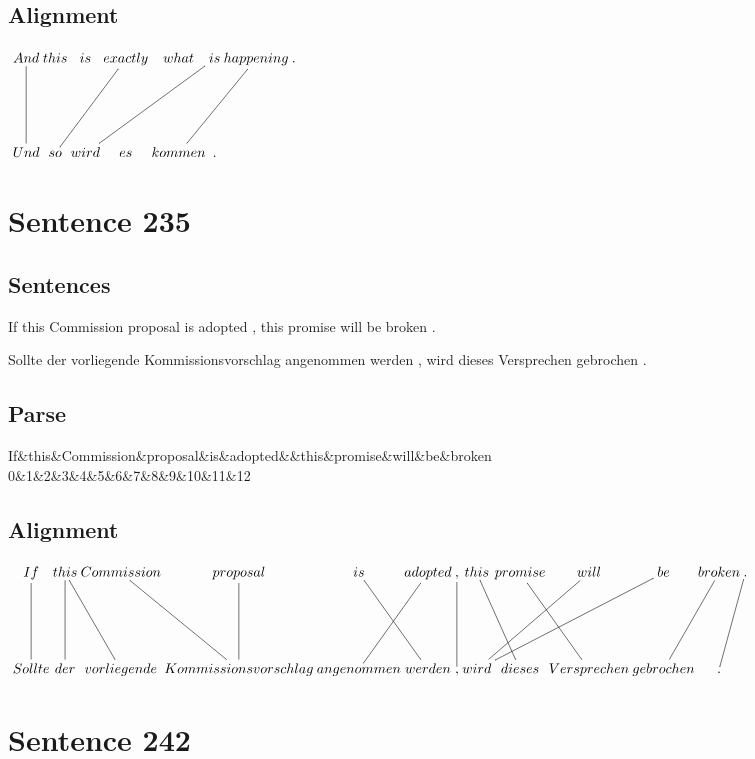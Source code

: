 \documentclass{report}
\begin{document}
\subsection*{Alignment}
\scriptsize{
$
\xymatrix@C-2.3pc{
And \ar @{-} [dd] & this & is & exactly \ar @{-} [ddll] & what & is \ar @{-} [ddlll] & happening \ar @{-} [ddll] & .\\\\
Und & so & wird & es & kommen & .
}$}
\newpage\section*{Sentence 235}

\subsection*{Sentences}
If this Commission proposal is adopted , this promise will be broken .

\noindent Sollte der vorliegende Kommissionsvorschlag angenommen werden , wird dieses Versprechen gebrochen .



\subsection*{Parse}
\begin{dependency}[theme=simple]
\begin{deptext}[column sep=.5cm, row sep=.1ex]
If\&this\&Commission\&proposal\&is\&adopted\&\&this\&promise\&will\&be\&broken\\
0\&1\&2\&3\&4\&5\&6\&7\&8\&9\&10\&11\&12\\
\end{deptext}
\end{dependency}


\subsection*{Alignment}
\scriptsize{
$
\xymatrix@C-2.3pc{
If \ar @{-} [dd] & this \ar @{-} [ddr] \ar @{-} [dd] & Commission \ar @{-} [ddr] & proposal \ar @{-} [dd] & is \ar @{-} [ddr] & adopted \ar @{-} [ddl] & , \ar @{-} [dd] & this \ar @{-} [ddr] & promise \ar @{-} [ddr] & will \ar @{-} [ddll] & be \ar @{-} [ddlll] & broken \ar @{-} [ddl] & . \ar @{-} [ddl]\\\\
Sollte & der & vorliegende & Kommissionsvorschlag & angenommen & werden & , & wird & dieses & Versprechen & gebrochen & .
}$}
\newpage\section*{Sentence 242}
\end{document}
